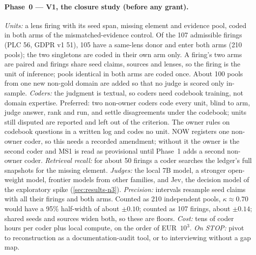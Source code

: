 \paragraph{Phase~0 --- V1, the closure study (before any grant).} \evfut{} \emph{Units:} a lens
firing with its seed span, missing element and evidence pool, coded in both arms of the
mismatched-evidence control. Of the 107 admissible firings (PLC 56, GDPR v1 51), 105 have a same-lens donor and enter both arms (210 pools); the two singletons are coded in their own arm only. A firing's two arms are paired and firings share seed claims, sources and lenses, so the firing is the unit
of inference; pools identical in both arms are coded once. About 100 pools from one new non-gold domain
are added so that no judge is scored only in-sample. \emph{Coders:} the judgment is textual, so coders
need codebook training, not domain expertise. Preferred: two non-owner coders code every unit, blind to
arm, judge answer, rank and run, and settle disagreements under the codebook; units still disputed are
reported and left out of the criterion. The owner rules on codebook questions in a written log and codes
no unit. NOW registers one non-owner coder, so this needs a recorded amendment; without it the owner is
the second coder and MS1 is read as provisional until Phase~1 adds a second non-owner coder.
\emph{Retrieval recall:} for about 50 firings a coder searches the ledger's full snapshots for the
missing element. \emph{Judges:} the local 7B model, a stronger open-weight model, frontier models from
other families, and Jev, the decision model of the exploratory spike (\cref{sec:results-n3}).
\emph{Precision:} intervals resample seed claims with all their firings and both arms. Counted as 210 independent pools, $\kappa \approx 0.70$ would have a 95\% half-width of about $\pm 0.10$; counted as 107
firings, about $\pm 0.14$; shared seeds and sources widen both, so these are floors. \emph{Cost:} tens
of coder hours per coder plus local compute, on the order of EUR~$10^3$. \emph{On STOP:} pivot to
reconstruction as a documentation-audit tool, or to interviewing without a gap map.

